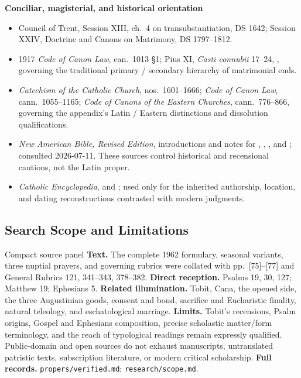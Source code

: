\begin{deepstudy}
\textbf{Conciliar, magisterial, and historical orientation}
{\footnotesize
\begin{itemize}[itemsep=0em,topsep=0.15em,parsep=0pt]
\item Council of Trent, Session XIII, ch.~4 on transubstantiation, DS 1642; Session XXIV, Doctrine and Canons on Matrimony, DS 1797--1812.
\item 1917 \emph{Code of Canon Law}, can.~1013 \S1; Pius XI, \emph{Casti connubii} 17--24, , governing the traditional primary / secondary hierarchy of matrimonial ends.
\item \emph{Catechism of the Catholic Church}, nos.~1601--1666; \emph{Code of Canon Law}, cann.~1055--1165; \emph{Code of Canons of the Eastern Churches}, cann.~776--866, governing the appendix's Latin / Eastern distinctions and dissolution qualifications.
\item \emph{New American Bible, Revised Edition}, introductions and notes for , , , and ; consulted 2026-07-11. These sources control historical and recensional cautions, not the Latin proper.
\item \emph{Catholic Encyclopedia},  and ; used only for the inherited authorship, location, and dating reconstructions contrasted with modern judgments.
\end{itemize}
}

\subsection*{Search Scope and Limitations}

\begin{studybox}{Compact source panel}
\textbf{Text.} The complete 1962 formulary, seasonal variants, three nuptial prayers, and governing rubrics were collated with pp.~[75]--[77] and General Rubrics 121, 341--343, 378--382. \textbf{Direct reception.} Psalms 19, 30, 127; Matthew 19; Ephesians 5. \textbf{Related illumination.} Tobit, Cana, the opened side, the three Augustinian goods, consent and bond, sacrifice and Eucharistic finality, natural teleology, and eschatological marriage. \textbf{Limits.} Tobit's recensions, Psalm origins, Gospel and Ephesians composition, precise scholastic matter/form terminology, and the reach of typological readings remain expressly qualified. Public-domain and open sources do not exhaust manuscripts, untranslated patristic texts, subscription literature, or modern critical scholarship. \textbf{Full records.} \nolinkurl{propers/verified.md}; \nolinkurl{research/scope.md}.
\end{studybox}


\end{deepstudy}
